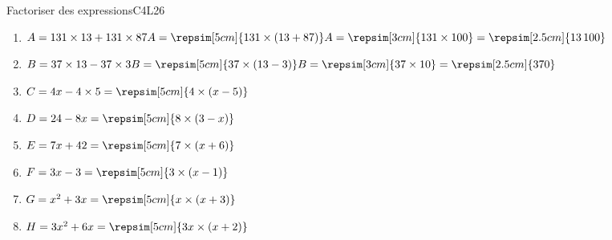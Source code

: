 \begin{EXO}{Factoriser des expressions}{C4L26}
    \begin{multicols}{2}
    \begin{enumerate}
        \item $A=131\times13 + 131\times87\\A=\repsim[5cm]{131 \times (13  + 87)}\\A =\repsim[3cm]{131 \times 100} = \repsim[2.5cm]{13\,100}$
        \item $B=37\times13-37\times3\\B=\repsim[5cm]{37 \times (13  - 3)}\\B =\repsim[3cm]{37 \times 10} = \repsim[2.5cm]{370}$
        \item $C=4x-4\times 5 =\repsim[5cm]{4 \times (x  -5)}$
        \item $D=24-8x =\repsim[5cm]{8 \times (3  - x)}$
        \item $E=7x+42 =\repsim[5cm]{7 \times (x + 6)}$
        \item $F=3x-3 = \repsim[5cm]{3 \times (x  - 1)}$
        \item $G=x^{2}+3x =\repsim[5cm]{x \times (x  + 3 )}$
        \item $H=3x^{2}+6x =\repsim[5cm]{3x \times (x  + 2)}$
    \end{enumerate}
\end{multicols}
\end{EXO}

\newpage
